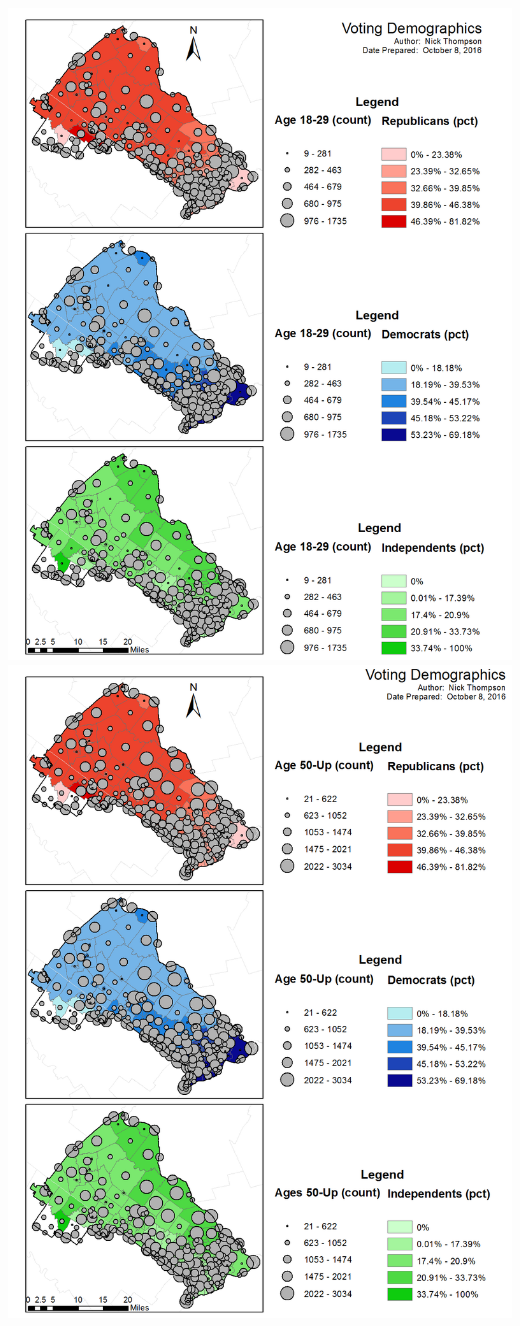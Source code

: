 \documentclass[]{article}
\begin{document}
\includegraphics{question_3a.png} \includegraphics{question_3c.png}
\end{document}
